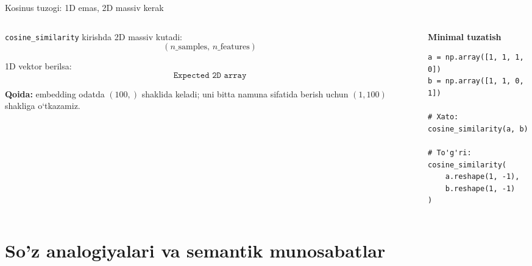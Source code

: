 \documentclass[aspectratio=169,11pt]{beamer}
\begin{document}
\begin{frame}[fragile]{Kosinus tuzog\textquotesingle{}i: 1D emas, 2D massiv kerak}
\scriptsize

\begin{columns}[T,totalwidth=\textwidth]
\begin{column}{0.47\textwidth}

\begin{tcolorbox}[alertbox,title=Tez-tez uchraydigan xato]
\texttt{cosine\_similarity} kirishda 2D massiv kutadi:
\[
(n\_\text{samples},\,n\_\text{features})
\]

1D vektor berilsa:
\[
\texttt{Expected\ 2D\ array}
\]
\end{tcolorbox}

\vspace{4pt}
\textbf{Qoida:} embedding odatda $(100,)$ shaklida keladi; uni bitta namuna sifatida berish uchun $(1,100)$ shakliga o‘tkazamiz.

\end{column}

\begin{column}{0.49\textwidth}
\textbf{Minimal tuzatish}

\vspace{2pt}
\begin{tcolorbox}[defbox,left=2mm,right=2mm,top=1mm,bottom=1mm]
\begin{verbatim}
a = np.array([1, 1, 1, 0])
b = np.array([1, 1, 0, 1])

# Xato:
cosine_similarity(a, b)

# To'g'ri:
cosine_similarity(
    a.reshape(1, -1),
    b.reshape(1, -1)
)
\end{verbatim}
\end{tcolorbox}

\end{column}
\end{columns}

\end{frame}

\section[Analogiyalar]{So'z analogiyalari va semantik munosabatlar}
\end{document}
